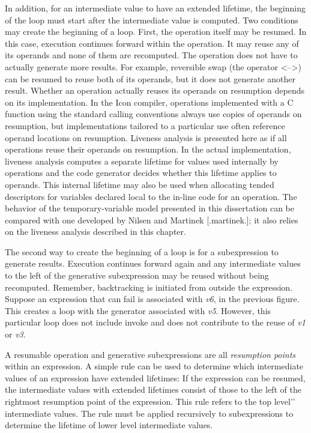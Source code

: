 In addition, for an intermediate value to have an extended lifetime,
the beginning of the loop must start after the intermediate value is
computed. Two conditions may create the beginning of a loop. First,
the operation itself may be resumed. In this case, execution continues
forward within the operation. It may reuse any of its operands and
none of them are recomputed. The operation does not have to actually
generate more results. For example, reversible swap (the operator
{\textless}--{\textgreater}) can be resumed to reuse both of its
operands, but it does not generate another result. Whether an
operation actually reuses its operands on resumption depends on its
implementation. In the Icon compiler, operations implemented with a C
function using the standard calling conventions always use copies of
operands on resumption, but implementations tailored to a particular
use often reference operand locations on resumption.  Liveness
analysis is presented here as if all operations reuse their operands
on resumption. In the actual implementation, liveness analysis
computes a separate lifetime for values used internally by operations
and the code generator decides whether this lifetime applies to
operands. This internal lifetime may also be used when allocating
tended descriptors for variables declared local to the in-line code
for an operation. The behavior of the temporary-variable model
presented in this dissertation can be compared with one developed by
Nilsen and Martinek [.martinek.]; it also relies on the liveness
analysis described in this chapter.

The second way to create the beginning of a loop is for a
subexpression to generate results. Execution continues forward again
and any intermediate values to the left of the generative
subexpression may be reused without being recomputed.  Remember,
backtracking is initiated from outside the expression. Suppose an
expression that can fail is associated with \textit{v6}, in the
previous figure. This creates a loop with the generator associated
with \textit{v5}. However, this particular loop does not include
invoke and does not contribute to the reuse of \textit{v1} or
\textit{v3}.

A resumable operation and generative subexpressions are all
\textit{resumption points} within an expression. A simple rule can be
used to determine which intermediate values of an expression have
extended lifetimes: If the expression can be resumed, the intermediate
values with extended lifetimes consist of those to the left of the
rightmost resumption point of the expression. This rule refers to the
{\textasciigrave}{\textasciigrave}top level'{}' intermediate values.
The rule must be applied recursively to subexpressions to determine
the lifetime of lower level intermediate values.

